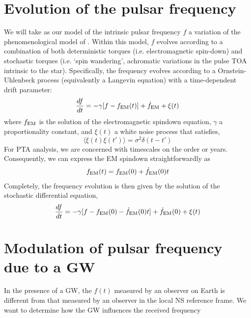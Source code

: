 \documentclass[fleqn,usenatbib,useAMS]{mnras}
\begin{document}
\section{Evolution of the pulsar frequency}
We will take as our model of the intrinsic pulsar frequency $f$ a variation of the phenomenological model of \citep{Vargas}. Within this model, $f$ evolves according to a combination of both deterministic torques (i.e. electromagnetic spin-down) and stochastic torques (i.e. `spin wandering', achromatic variations in the pulse TOA intrinsic to the star). Specifically, the frequency evolves according to a Ornstein-Uhlenbeck process (equivalently a Langevin equation) with a time-dependent drift parameter:
\begin{equation}
	\frac{df}{dt} = -\gamma	 [f - f_{\rm EM} (t)] + \dot{f}_{\rm EM} + \xi(t)
	\label{eq:frequency_evolution}
\end{equation}
where $f_{\rm EM}$ is the solution of the electromagnetic spindown equation, $\gamma$ a proportionality constant, and $\xi(t)$ a white noise process that satisfies,
\begin{equation}
	\langle \xi(t) \xi(t') \rangle = \sigma^2 \delta(t - t')
\end{equation}
For PTA analysis, we are concerned with timescales on the order or years. Consequently, we can express the EM spindown straightforwardly as
\begin{equation}
	f_{\rm EM} (t) = f_{\rm EM}(0) + \dot{f}_{\rm EM} (0)t
\end{equation}  
Completely, the frequency evolution is then given by the solution of the stochastic differential equation,
\begin{equation}
	\frac{df}{dt} = -\gamma	 [f - f_{\rm EM}(0) - \dot{f}_{\rm EM} (0)t] + \dot{f}_{\rm EM} (0) + \xi(t)
	\label{eq:frequency_evolution_expanded}
\end{equation}


\section{Modulation of pulsar frequency due to a GW}
In the presence of a GW, the $f(t)$ measured by an observer on Earth is different from that measured by an observer in the local NS reference frame. We want to determine how the GW influences the received frequency
\end{document}
